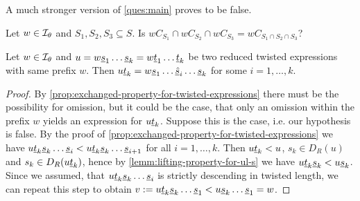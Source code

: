 A much stronger version of \ref{ques:main} proves to be false.

\begin{ques}
	Let $w \in \mathcal{I}_{\theta}$ and $S_1,S_2,S_3 \subseteq S$. Is $wC_{S_1} \cap wC_{S_2} \cap wC_{S_3} = wC_{S_1 \cap S_2 \cap S_3}$?
	\todo
\end{ques}

\begin{lemm}
	Let $w \in \mathcal{I}_{\theta}$ and $u = w \underline{s}_1 \ldots \underline{s}_k = w \underline{t}_1 \ldots \underline{t}_k$ be two reduced twisted expressions with same prefix $w$. Then $u \underline{t}_k = w \underline{s}_1 \ldots \underline{\hat s}_i \ldots \underline{s}_k$ for some $i = 1,\ldots,k$.

	\begin{proof}
		By \ref{prop:exchanged-property-for-twisted-expressions} there must be the possibility for omission, but it could be the case, that only an omission within the prefix $w$ yields an expression for $u \underline{t}_k$. Suppose this is the case, i.e. our hypothesis is false. By the proof of \ref{prop:exchanged-property-for-twisted-expressions} we have $u \underline{t}_k \underline{s}_k \ldots \underline{s}_i < u \underline{t}_k \underline{s}_k \ldots \underline{s}_{i+1}$ for all $i = 1,\ldots,k$. Then $u \underline{t}_k < u$, $s_k \in D_R(u)$ and $s_k \in D_R(u \underline{t}_k)$, hence by \ref{lemm:lifting-property-for-ul-s} we have $u \underline{t}_k \underline{s}_k < u \underline{s}_k$. Since we assumed, that $u \underline{t}_k \underline{s}_k \ldots \underline{s}_i$ is strictly descending in twisted length, we can repeat this step to obtain $v := u \underline{t}_k \underline{s}_k \ldots \underline{s}_1 < u \underline{s}_k \ldots \underline{s}_1 = w$.
	\end{proof}
\end{lemm}


